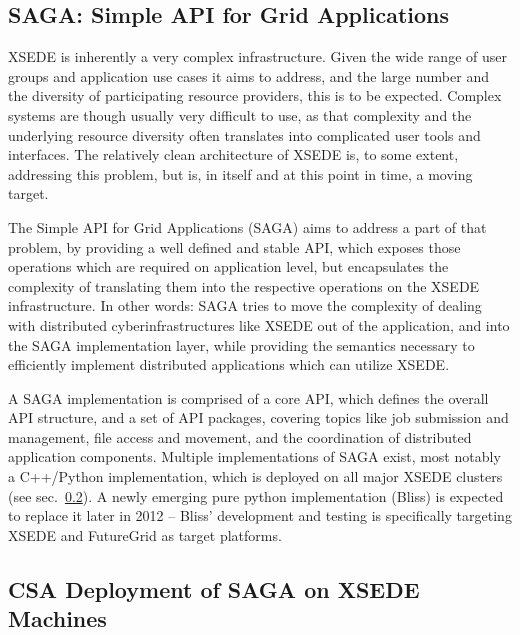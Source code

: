 \documentclass{sig-alternate}
\begin{document}
\subsection{SAGA: Simple API for Grid Applications}
 \label{ssec:saga}
 
 
XSEDE is inherently a very complex infrastructure.  Given the wide
range of user groups and application use cases it aims to address,
and the large number and the diversity of participating resource
providers, this is to be expected.  Complex systems are though
usually very difficult to use, as that complexity and the underlying
resource diversity often translates into complicated user tools and
interfaces.  The relatively clean architecture of XSEDE is, to some
extent, addressing this problem, but is, in itself and at this point
in time, a moving target.

The Simple API for Grid Applications (SAGA) aims to address a part of
that problem, by providing a well defined and stable API, which
exposes those operations which are required on application level, but
encapsulates the complexity of translating them into the respective
operations on the XSEDE infrastructure.  In other words: SAGA tries
to move the complexity of dealing with distributed
cyberinfrastructures like XSEDE out of the application, and into the
SAGA implementation layer, while providing the semantics necessary to
efficiently implement distributed applications which can utilize
XSEDE.

A SAGA implementation is comprised of a
core API, which defines the overall API structure, and a set of API
packages, covering topics like job submission and management, file
access and movement, and the coordination of distributed application
components.  Multiple implementations of SAGA exist, most notably a
C++/Python implementation, which is deployed on all major XSEDE
clusters (see sec.~\ref{ssec:csa}).  A newly emerging pure python
implementation (Bliss) is expected to replace it later in 2012 --
Bliss' development and testing is specifically targeting XSEDE and
FutureGrid as target platforms.

\subsection{CSA Deployment of SAGA on XSEDE Machines}
 \label{ssec:csa}
 
\end{document}
